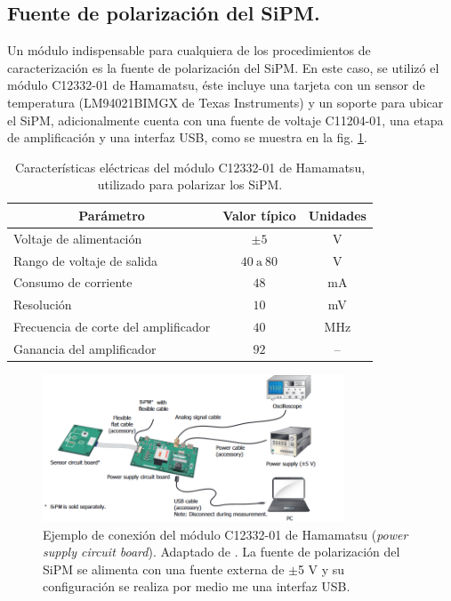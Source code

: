 \subsection{Fuente de polarización del SiPM.}
Un módulo indispensable para cualquiera de los procedimientos de caracterización es la fuente de polarización del SiPM. En este caso, se utilizó el módulo  C12332-01 de Hamamatsu, éste incluye una tarjeta con un sensor de temperatura (LM94021BIMGX de Texas Instruments)  y un soporte para ubicar el SiPM, adicionalmente cuenta con una fuente de voltaje C11204-01, una etapa de amplificación y una interfaz USB, como se muestra en la fig. \ref{fig:conexion_driverMPPC}.
\begin{table}[h!]
\caption{Características eléctricas del módulo  C12332-01 de Hamamatsu, utilizado para polarizar los SiPM.}
    \label{table_module_sorce}
	\centering
	\begin{tabular}{ c  c  c}
    \hline
    Parámetro       & Valor típico   & Unidades     \\ \hline
    \multicolumn{1}{l}{Voltaje de alimentación}     & $\pm 5$        & V        \\
    \multicolumn{1}{l}{Rango de voltaje de salida}      & $40~\mbox{a}~80$        & V          \\
    \multicolumn{1}{l}{Consumo de corriente}      & $48$        & mA          \\
    \multicolumn{1}{l}{Resolución}      & $10$        & mV          \\
    \multicolumn{1}{l}{Frecuencia de corte del amplificador}      & $40$        & MHz          \\
    \multicolumn{1}{l}{Ganancia del amplificador}      & $92$        &     --      \\ \hline
	\end{tabular}	
\end{table}
\begin{figure}[h!]
\begin{centering}
  \includegraphics[width=0.8\textwidth]{Images/Source_module.PNG}
    \caption{Ejemplo de conexión del módulo C12332-01 de Hamamatsu (\textit{power supply circuit board}). Adaptado de \citep{Driver_mppc}. La fuente de polarización del SiPM se alimenta con una fuente externa de $\pm$5 V  y su configuración se realiza por medio me una interfaz USB.}
    \label{fig:conexion_driverMPPC}
  \par\end{centering}
\end{figure}
